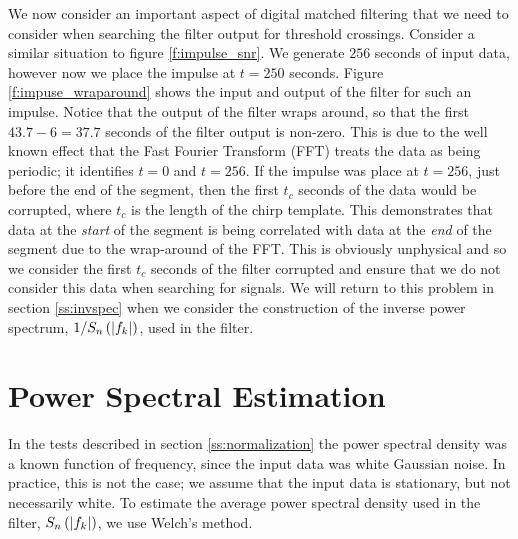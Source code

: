 We now consider an important aspect of digital matched filtering that we need
to consider when searching the filter output for threshold crossings. Consider
a similar situation to figure \ref{f:impulse_snr}. We generate $256$ seconds of
input data, however now we place the impulse at $t = 250$ seconds. Figure
\ref{f:impuse_wraparound} shows the input and output of the filter for such an
impulse. Notice that the output of the filter wraps around, so that the first 
$43.7-6 = 37.7$ seconds of the filter output is non-zero. This is due to the
well known effect that the Fast Fourier Transform (FFT) treats the data as being
periodic; it identifies $t=0$ and $t=256$\cite{fftbook}. If the impulse was
place at $t=256$, just before the end of the segment, then the first $t_c$
seconds of the data would be corrupted, where $t_c$ is the length of the chirp
template. This demonstrates that data at the \emph{start} of the segment is
being correlated with data at the \emph{end} of the segment due to the
wrap-around of the FFT. This is obviously unphysical and so we consider the
first $t_c$ seconds of the filter corrupted and ensure that we do not consider
this data when searching for signals. We will return to this problem in section
\ref{ss:invspec} when we consider the construction of the inverse power
spectrum, $1/S_n\left(\left|f_{k}\right|\right)$, used in the filter.

\section{Power Spectral Estimation}
\label{ss:psd}

In the tests described in section \ref{ss:normalization} the power spectral
density was a known function of frequency, since the input data was white
Gaussian noise. In practice, this is not the case; we assume that the input
data is stationary, but not necessarily white. To estimate the average power
spectral density used in the filter, $S_n\left(\left|f_{k}\right|\right)$, we use Welch's method\cite{fftbook}. 

